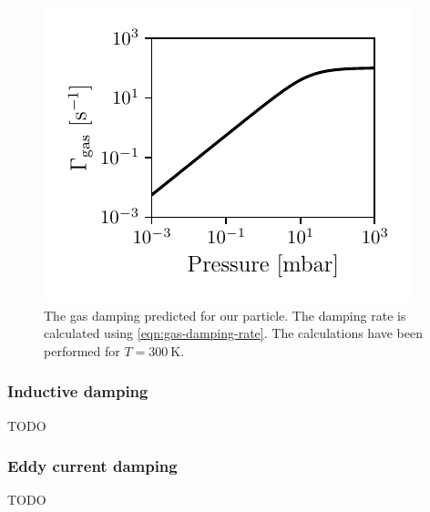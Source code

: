 \begin{figure}
    \centering
    \includegraphics{figures/data/gas_damping.pdf}
    \caption{The gas damping predicted for our particle. The damping rate is calculated using \autoref{eqn:gas-damping-rate}. The calculations have been performed for $T=\qty{300}{\kelvin}$.}
    \label{fig:gas-damping}
\end{figure}

\subsubsection{Inductive damping}
TODO

\subsubsection{Eddy current damping}
TODO
